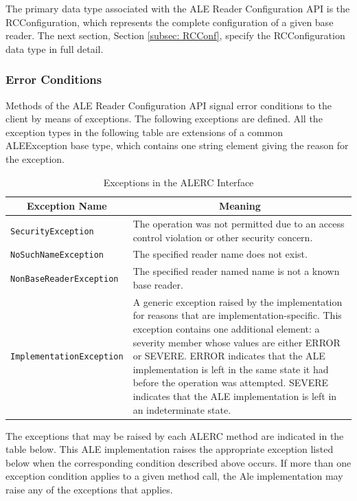 \documentclass[11pt,a4paper,oneside]{article}
\begin{document}
The primary data type associated with the ALE Reader Configuration API is the RCConfiguration, which represents the complete configuration of a given base reader. The next section, Section \ref{subsec: RCConf}, specify the RCConfiguration data type in full detail.

\subsubsection{Error Conditions}
Methods of the ALE Reader Configuration API signal error conditions to the client by means of exceptions. The following exceptions are defined. All the exception types in the following table are extensions of a common\ifpdf\\\fi ALEException base type, which contains one string element giving the reason for the exception.

\begin{table}[!h]
\begin{tabularx}{\linewidth}{|l|X|}
\hline
\multicolumn{1}{|c|}{\textbf{Exception Name}}&
\multicolumn{1}{c|}{\textbf{Meaning}}\\
\hline
\texttt{SecurityException}&The operation was not permitted due to an access control violation or other security concern.\\
\hline
\texttt{NoSuchNameException} &The specified reader name does not exist.\\
\hline
\texttt{NonBaseReaderException}&The specified reader named name is not a known base reader.\\
\hline
\texttt{ImplementationException}&A generic exception raised by the implementation for reasons that are implementation-specific. This exception contains one additional element: a severity member whose values are either ERROR or SEVERE. ERROR indicates that the ALE implementation is left in the same state it had before the operation was attempted. SEVERE indicates that the ALE implementation is left in an indeterminate state.\\
\hline
\end{tabularx}
\caption{Exceptions in the ALERC Interface}
\ifpdf
\MakeLineNo
\fi
\end{table}
\FloatBarrier

The exceptions that may be raised by each ALERC method are indicated in the table below. This ALE implementation raises the appropriate exception listed below when the corresponding condition described above occurs. If more than one exception condition applies to a given method call, the Ale implementation may raise any of the exceptions that applies.
\end{document}
